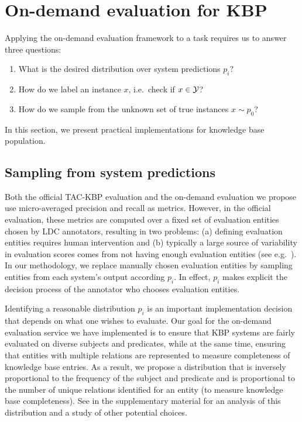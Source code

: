 \section{On-demand evaluation for KBP}
\label{sec:application}
Applying the on-demand evaluation framework to a task requires us to answer three questions:
\begin{enumerate}
    \itemsep0pt
  \item What is the desired distribution over system predictions $p_i$?
  \item How do we label an instance $x$, i.e.\ check if $x \in \mathcal{Y}$?
  \item How do we sample from the unknown set of true instances $x \sim p_0$?
\end{enumerate}
In this section, we present practical implementations for knowledge base population.

\subsection{Sampling from system predictions}
Both the official TAC-KBP evaluation and the on-demand evaluation we propose use micro-averaged precision and recall as metrics. However, in the official evaluation, these metrics are computed over a fixed set of evaluation entities chosen by LDC annotators, resulting in two problems: (a) defining evaluation entities requires human intervention and (b) typically a large source of variability in evaluation scores comes from not having enough evaluation entities (see e.g.\ \citep{webber2010measurement}). In our methodology, we replace manually chosen evaluation entities by sampling entities from each system’s output according $p_i$. In effect, $p_i$ makes explicit the decision process of the annotator who chooses evaluation entities.

Identifying a reasonable distribution $p_i$ is an important implementation decision that depends on what one wishes to evaluate.
Our goal for the on-demand evaluation service we have implemented is to ensure that KBP systems are fairly evaluated on diverse subjects and predicates, while at the same time, ensuring that entities with multiple relations are represented to measure completeness of knowledge base entries.
As a result, we propose a distribution that is inversely proportional to the frequency of the subject and predicate and is proportional to the number of unique relations identified for an entity (to measure knowledge base completeness).
See  in the supplementary material for an analysis of this distribution and a study of other potential choices.

